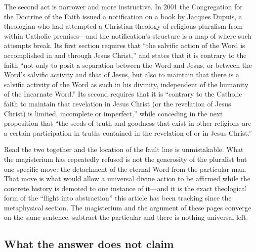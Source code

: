The second act is narrower and more instructive. In 2001 the Congregation for the Doctrine of the Faith issued a notification on a book by Jacques Dupuis, a theologian who had attempted a Christian theology of religious pluralism from within Catholic premises---and the notification's structure is a map of where such attempts break. Its first section requires that ``the salvific action of the Word is accomplished in and through Jesus Christ,'' and states that it is contrary to the faith ``not only to posit a separation between the Word and Jesus, or between the Word's salvific activity and that of Jesus, but also to maintain that there is a salvific activity of the Word as such in his divinity, independent of the humanity of the Incarnate Word.'' Its second requires that it is ``contrary to the Catholic faith to maintain that revelation in Jesus Christ (or the revelation of Jesus Christ) is limited, incomplete or imperfect,'' while conceding in the next proposition that ``the seeds of truth and goodness that exist in other religions are a certain participation in truths contained in the revelation of or in Jesus Christ.''

Read the two together and the location of the fault line is unmistakable. What the magisterium has repeatedly refused is not the generosity of the pluralist but one specific move: the detachment of the eternal Word from the particular man. That move is what would allow a universal divine action to be affirmed while the concrete history is demoted to one instance of it---and it is the exact theological form of the ``flight into abstraction'' this article has been tracking since the metaphysical section. The magisterium and the argument of these pages converge on the same sentence: subtract the particular and there is nothing universal left.

\subsection{What the answer does not claim}

